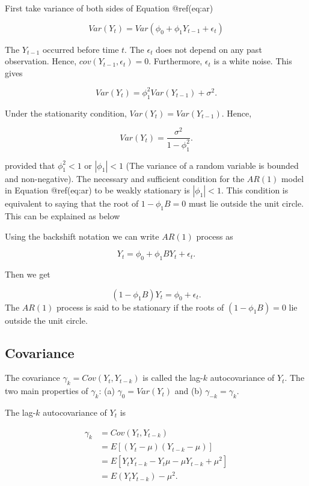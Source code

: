 \documentclass[
  11pt,
  a4paper,
]{report}
\begin{document}
First take variance of both sides of Equation @ref(eq:ar)

\[Var(Y_t)=Var(\phi_0+\phi_1 Y_{t-1}+\epsilon_t)\]

The \(Y_{t-1}\) occurred before time \(t\). The \(\epsilon_t\) does not
depend on any past observation. Hence, \(cov(Y_{t-1}, \epsilon_t)= 0\).
Furthermore, \({\epsilon_t}\) is a white noise. This gives

\[Var(Y_t)=\phi_1^2 Var(Y_{t-1})+\sigma^2.\]

Under the stationarity condition, \(Var(Y_t)=Var(Y_{t-1})\). Hence,

\[Var(Y_t)=\frac{\sigma^2}{1-\phi_1^2}.\]

provided that \(\phi_1^2 < 1\) or \(|\phi_1| < 1\) (The variance of a
random variable is bounded and non-negative). The necessary and
sufficient condition for the \(AR(1)\) model in Equation @ref(eq:ar) to
be weakly stationary is \(|\phi_1| < 1\). This condition is equivalent
to saying that the root of \(1-\phi_1B = 0\) must lie outside the unit
circle. This can be explained as below

Using the backshift notation we can write \(AR(1)\) process as

\[Y_t = \phi_0 + \phi_1BY_{t} + \epsilon_t.\]

Then we get

\[(1-\phi_1B)Y_t=\phi_0 + \epsilon_t.\] The \(AR(1)\) process is said to
be stationary if the roots of \((1-\phi_1B)=0\) lie outside the unit
circle.

\subsection{Covariance}\label{covariance}

The covariance \(\gamma_k=Cov(Y_t, Y_{t-k})\) is called the lag-\(k\)
autocovariance of \(Y_t\). The two main properties of \(\gamma_k\): (a)
\(\gamma_0=Var(Y_t)\) and (b) \(\gamma_{-k}=\gamma_{k}\).

The lag-\(k\) autocovariance of \(Y_t\) is

\begin{equation}
  \label{eq:3}
\begin{aligned}
  \gamma_k &= Cov(Y_t, Y_{t-k}) \\
         &= E[(Y_t-\mu)(Y_{t-k}-\mu)] \\
         &= E[Y_tY_{t-k}-Y_t\mu-\mu Y_{t-k} +\mu^2] \\
         &= E(Y_t Y_{t-k}) - \mu^2. \\
\end{aligned}
\end{equation}
\end{document}

